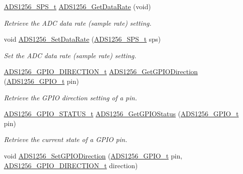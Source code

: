 \begin{DoxyCompactItemize}
\hyperlink{group__ads1256__driver_gab0437f81aad031aadf3e05dd5fe0a731}{A\-D\-S1256\-\_\-\-S\-P\-S\-\_\-t} \hyperlink{group__ads1256__driver_gacf2f61cb43087ae7c270f00d24b27526}{A\-D\-S1256\-\_\-\-Get\-Data\-Rate} (void)
\begin{DoxyCompactList}\small\item\em Retrieve the A\-D\-C data rate (sample rate) setting. \end{DoxyCompactList}\item 
void \hyperlink{group__ads1256__driver_ga14de02499be3d1dae8497b4e048b9568}{A\-D\-S1256\-\_\-\-Set\-Data\-Rate} (\hyperlink{group__ads1256__driver_gab0437f81aad031aadf3e05dd5fe0a731}{A\-D\-S1256\-\_\-\-S\-P\-S\-\_\-t} sps)
\begin{DoxyCompactList}\small\item\em Set the A\-D\-C data rate (sample rate) setting. \end{DoxyCompactList}\item 
\hyperlink{group__ads1256__driver_ga4df06f2662792cc9eff4ac7f97e35026}{A\-D\-S1256\-\_\-\-G\-P\-I\-O\-\_\-\-D\-I\-R\-E\-C\-T\-I\-O\-N\-\_\-t} \hyperlink{group__ads1256__driver_gacc11f35703f43c395edb1e56c93d707f}{A\-D\-S1256\-\_\-\-Get\-G\-P\-I\-O\-Direction} (\hyperlink{group__ads1256__driver_gaf55f2ff09e67223f3e5e0a6eb69de98b}{A\-D\-S1256\-\_\-\-G\-P\-I\-O\-\_\-t} pin)
\begin{DoxyCompactList}\small\item\em Retrieve the G\-P\-I\-O direction setting of a pin. \end{DoxyCompactList}\item 
\hyperlink{group__ads1256__driver_ga587084017ba4b239ffb8d90376921c2c}{A\-D\-S1256\-\_\-\-G\-P\-I\-O\-\_\-\-S\-T\-A\-T\-U\-S\-\_\-t} \hyperlink{group__ads1256__driver_gaf864f2f518cd80873993a8f2ca073e27}{A\-D\-S1256\-\_\-\-Get\-G\-P\-I\-O\-Status} (\hyperlink{group__ads1256__driver_gaf55f2ff09e67223f3e5e0a6eb69de98b}{A\-D\-S1256\-\_\-\-G\-P\-I\-O\-\_\-t} pin)
\begin{DoxyCompactList}\small\item\em Retrieve the current state of a G\-P\-I\-O pin. \end{DoxyCompactList}\item 
void \hyperlink{group__ads1256__driver_gacea1f1adb429508088a4a32029f90d00}{A\-D\-S1256\-\_\-\-Set\-G\-P\-I\-O\-Direction} (\hyperlink{group__ads1256__driver_gaf55f2ff09e67223f3e5e0a6eb69de98b}{A\-D\-S1256\-\_\-\-G\-P\-I\-O\-\_\-t} pin, \hyperlink{group__ads1256__driver_ga4df06f2662792cc9eff4ac7f97e35026}{A\-D\-S1256\-\_\-\-G\-P\-I\-O\-\_\-\-D\-I\-R\-E\-C\-T\-I\-O\-N\-\_\-t} direction)

\end{DoxyCompactItemize}
